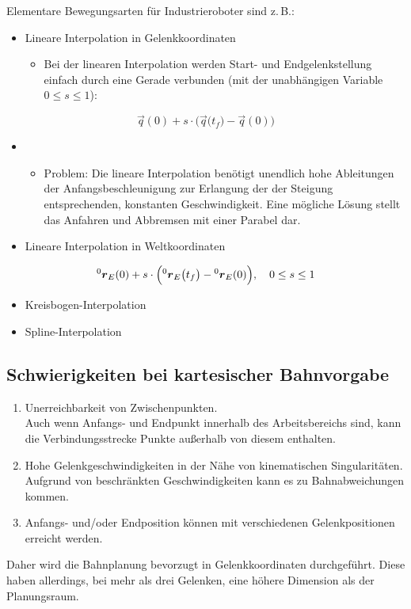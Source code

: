 		Elementare Bewegungsarten für Industrieroboter sind z.\,B.:
		\begin{itemize}
			\item Lineare Interpolation in Gelenkkoordinaten
				\begin{itemize}
					\item Bei der linearen Interpolation werden Start- und Endgelenkstellung einfach durch eine Gerade verbunden (mit der unabhängigen Variable \( 0 \leq s \leq 1 \)):
				\end{itemize}
		\end{itemize}
		\begin{equation*}
			\vec{q}(0) + s \cdot \Big( \vec{q}\big(t_f\big) - \vec{q}(0) \Big)
		\end{equation*}
		\begin{itemize}
			\item[]
				\begin{itemize}
					\item Problem: Die lineare Interpolation benötigt unendlich hohe Ableitungen der Anfangsbeschleunigung zur Erlangung der der Steigung entsprechenden, konstanten Geschwindigkeit. Eine mögliche Lösung stellt das Anfahren und Abbremsen mit einer Parabel dar.
				\end{itemize}
			\item Lineare Interpolation in Weltkoordinaten
		\end{itemize}
		\begin{equation*}
			\prescript{0}{}{\vec{r}}_E(0) + s \cdot \Big(\! \prescript{0}{}{\vec{r}}_E \big(t_f\big) - \prescript{0}{}{\vec{r}}_E(0) \Big),\quad 0 \leq s \leq 1
		\end{equation*}
		\begin{itemize}
			\item Kreisbogen-Interpolation
			\item Spline-Interpolation
		\end{itemize}

		\subsection{Schwierigkeiten bei kartesischer Bahnvorgabe}
			\begin{enumerate}
				\item Unerreichbarkeit von Zwischenpunkten. \\ Auch wenn Anfangs- und Endpunkt innerhalb des Arbeitsbereichs sind, kann die Verbindungsstrecke Punkte außerhalb von diesem enthalten.
				\item Hohe Gelenkgeschwindigkeiten in der Nähe von kinematischen Singularitäten. \\ Aufgrund von beschränkten Geschwindigkeiten kann es zu Bahnabweichungen kommen.
				\item Anfangs- und/oder Endposition können mit verschiedenen Gelenkpositionen erreicht werden.
			\end{enumerate}
			Daher wird die Bahnplanung bevorzugt in Gelenkkoordinaten durchgeführt. Diese haben allerdings, bei mehr als drei Gelenken, eine höhere Dimension als der Planungsraum.

